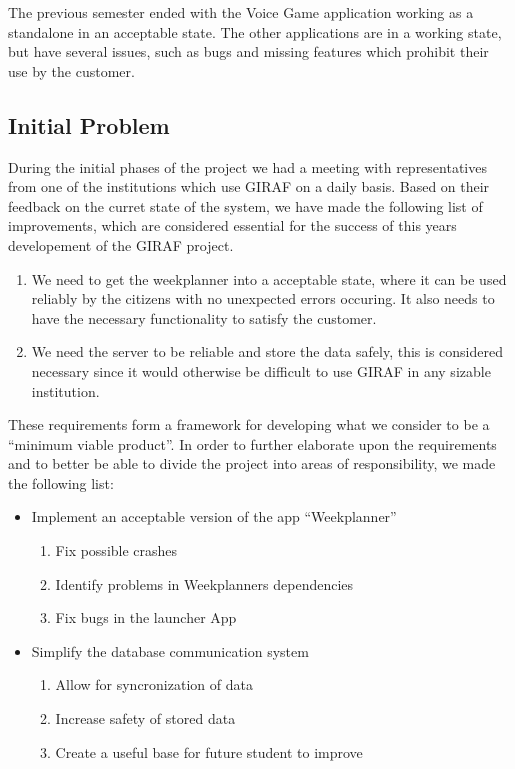 The previous semester ended with the Voice Game application working as a
standalone in an acceptable state. The other applications are in a working
state, but have several issues, such as bugs and missing features which
prohibit their use by the customer.
  
\subsection{Initial Problem}
During the initial phases of the project we had a meeting with representatives
from one of the institutions which use GIRAF on a daily basis. Based on their
feedback on the curret state of the system, we have made the following list of
improvements, which are considered essential for the success of this years
developement of the GIRAF project.

\begin{enumerate}
  \item We need to get the weekplanner into a acceptable state, where it can be
  used reliably by the citizens with no unexpected errors occuring. It also
  needs to have the necessary functionality to satisfy the customer.
  \item We need the server to be reliable and store the data safely, this is
  considered necessary since it would otherwise be difficult to use GIRAF in any
  sizable institution.
\end{enumerate}

These requirements form a framework for developing what we consider to be a
``minimum viable product''. In order to further elaborate upon the requirements
and to better be able to divide the project into areas of responsibility, we
made the following list:

\begin{itemize}
  \item Implement an acceptable version of the app ``Weekplanner''
  	\begin{enumerate}
  		\item Fix possible crashes
  		\item Identify problems in Weekplanners dependencies
  		\item Fix bugs in the launcher App
	\end{enumerate}
  \item Simplify the database communication system
   	\begin{enumerate}
  		\item Allow for syncronization of data
  		\item Increase safety of stored data
  		\item Create a useful base for future student to improve
	\end{enumerate}
\end{itemize}


